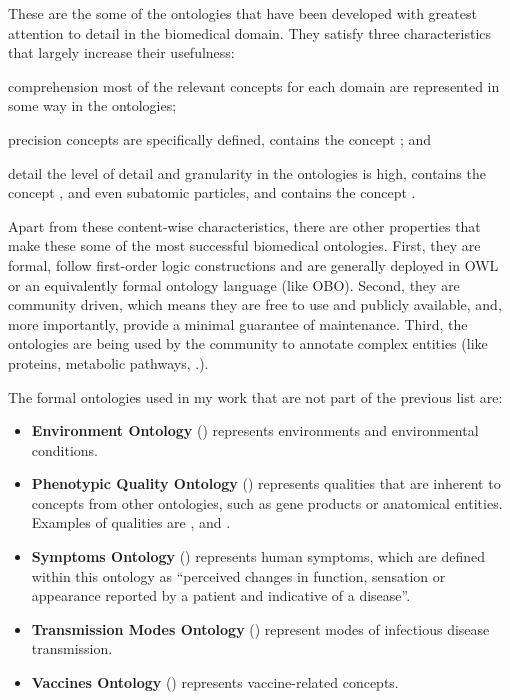 These are the some of the ontologies that have been developed with greatest attention to detail in the biomedical domain. They satisfy three characteristics that largely increase their usefulness:
\begin{paralist}
    \item comprehension \mdash most of the relevant concepts for each domain are represented in some way in the ontologies;
    \item precision \mdash concepts are specifically defined, \eg {} contains the concept ; and
    \item detail \mdash the level of detail and granularity in the ontologies is high, \eg {} contains the concept , and even subatomic particles, and  contains the concept .
\end{paralist}

Apart from these content-wise characteristics, there are other properties that make these some of the most successful biomedical ontologies. First, they are formal, follow first-order logic constructions and are generally deployed in OWL or an equivalently formal ontology language (like OBO). Second, they are community driven, which means they are free to use and publicly available, and, more importantly, provide a minimal guarantee of maintenance. Third, the ontologies are being used by the community to annotate complex entities (like proteins, metabolic pathways, \etc.).

The formal ontologies used in my work that are not part of the previous list are:
\begin{itemize}
    \item \textbf{Environment Ontology} () represents environments and environmental conditions.
    
    \item \textbf{Phenotypic Quality Ontology} () represents qualities that are inherent to concepts from other ontologies, such as gene products or anatomical entities. Examples of qualities are ,  and .
    
    \item \textbf{Symptoms Ontology} () represents human symptoms, which are defined within this ontology as ``perceived changes in function, sensation or appearance reported by a patient and indicative of a disease''.
    
    \item \textbf{Transmission Modes Ontology} () represent modes of infectious disease transmission.
    
    \item \textbf{Vaccines Ontology} () represents vaccine-related concepts.
\end{itemize}

